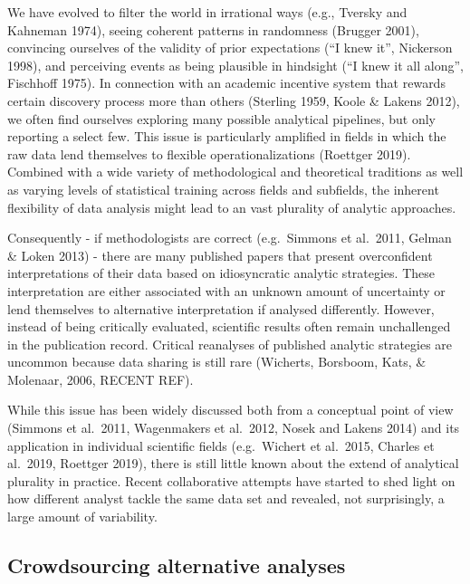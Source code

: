 \documentclass[
  english,
  man]{apa6}
\begin{document}
We have evolved to filter the world in irrational ways (e.g., Tversky and Kahneman 1974), seeing coherent patterns in randomness (Brugger 2001), convincing ourselves of the validity of prior expectations (\enquote{I knew it}, Nickerson 1998), and perceiving events as being plausible in hindsight (\enquote{I knew it all along}, Fischhoff 1975). In connection with an academic incentive system that rewards certain discovery process more than others (Sterling 1959, Koole \& Lakens 2012), we often find ourselves exploring many possible analytical pipelines, but only reporting a select few. This issue is particularly amplified in fields in which the raw data lend themselves to flexible operationalizations (Roettger 2019). Combined with a wide variety of methodological and theoretical traditions as well as varying levels of statistical training across fields and subfields, the inherent flexibility of data analysis might lead to an vast plurality of analytic approaches.

Consequently - if methodologists are correct (e.g.~Simmons et al.~2011, Gelman \& Loken 2013) - there are many published papers that present overconfident interpretations of their data based on idiosyncratic analytic strategies. These interpretation are either associated with an unknown amount of uncertainty or lend themselves to alternative interpretation if analysed differently. However, instead of being critically evaluated, scientific results often remain unchallenged in the publication record. Critical reanalyses of published analytic strategies are uncommon because data sharing is still rare (Wicherts, Borsboom, Kats, \& Molenaar, 2006, RECENT REF).

While this issue has been widely discussed both from a conceptual point of view (Simmons et al.~2011, Wagenmakers et al.~2012, Nosek and Lakens 2014) and its application in individual scientific fields (e.g.~Wichert et al.~2015, Charles et al.~2019, Roettger 2019), there is still little known about the extend of analytical plurality in practice. Recent collaborative attempts have started to shed light on how different analyst tackle the same data set and revealed, not surprisingly, a large amount of variability.

\hypertarget{crowdsourcing-alternative-analyses}{%
\subsection{Crowdsourcing alternative analyses}\label{crowdsourcing-alternative-analyses}}
\end{document}
